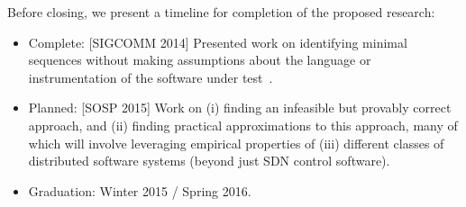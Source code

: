 Before closing, we present a timeline for completion of the proposed research:

\begin{itemize}
\item Complete: [SIGCOMM 2014] Presented work on identifying minimal sequences without making assumptions about the
language or instrumentation of the software under test~\cite{sts2014}.
\item Planned: [SOSP 2015] Work on (i) finding an infeasible but provably correct
approach, and (ii) finding practical approximations to this approach, many of which will
involve leveraging empirical properties of (iii) different classes of distributed software
systems (beyond just SDN control software).
\item Graduation: Winter 2015 / Spring 2016.
\end{itemize}
